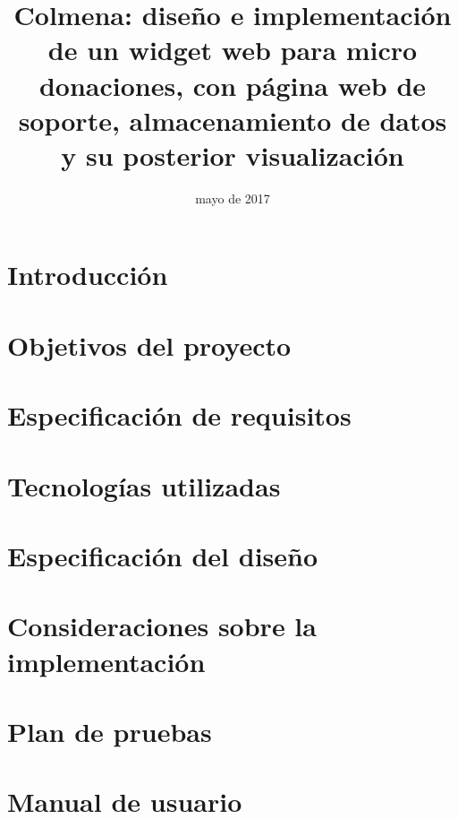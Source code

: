 \documentclass{memoriaPFC}
\title{Colmena: diseño e implementación de un widget web para micro donaciones, con página web de soporte, almacenamiento de datos y su posterior visualización}
\date{mayo de 2017}
\begin{document}
\frontmatter
\hacerportada
\hacerresumen
\tableofcontents
\listoffigures %
\listoftables %
\lstlistoflistings %

\mainmatter
\chapter{Introducción}



\chapter{Objetivos del proyecto}



\chapter{Especificación de requisitos}



\chapter{Tecnologías utilizadas}



\chapter{Especificación del diseño}



\chapter{Consideraciones sobre la implementación}



\chapter{Plan de pruebas}



\chapter{Manual de usuario}


\end{document}
